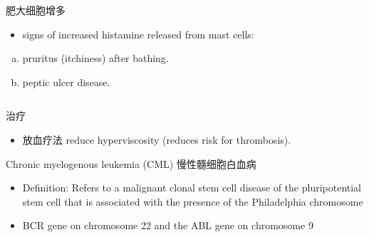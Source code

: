 \documentclass[
  ignorenonframetext,
]{beamer}
\providecommand{\tightlist}{%
  \setlength{\itemsep}{0pt}\setlength{\parskip}{0pt}}
\begin{document}
\begin{frame}
\begin{columns}[T]
\begin{column}{0.3\textwidth}
\begin{block}{肥大细胞增多}
\protect\hypertarget{ux80a5ux5927ux7ec6ux80deux589eux591a}{}
\begin{itemize}
\tightlist
\item
  signs of increased histamine released from mast cells:
\end{itemize}

\begin{enumerate}
[(a)]
\item
  pruritus (itchiness) after bathing.
\item
  peptic ulcer disease.
\end{enumerate}
\end{block}
\end{column}
\end{columns}
\end{frame}

\begin{frame}
\begin{block}{治疗}
\protect\hypertarget{ux6cbbux7597-1}{}
\begin{itemize}
\tightlist
\item
  放血疗法 reduce hyperviscosity (reduces risk for thrombosis).
\end{itemize}
\end{block}
\end{frame}

\begin{frame}
\begin{block}{Chronic myelogenous leukemia (CML) 慢性髓细胞白血病}
\protect\hypertarget{chronic-myelogenous-leukemia-cml-ux6162ux6027ux9ad3ux7ec6ux80deux767dux8840ux75c5}{}
\begin{itemize}
\item
  Definition: Refers to a malignant clonal stem cell disease of the
  pluripotential stem cell that is associated with the presence of the
  Philadelphia chromosome
\item
  BCR gene on chromosome 22 and the ABL gene on chromosome 9
\end{itemize}
\end{block}
\end{frame}
\end{document}
